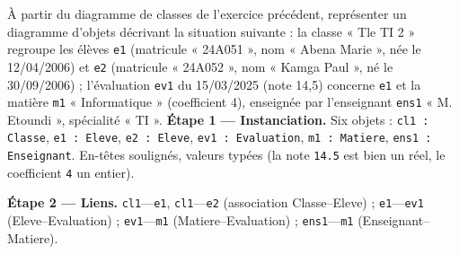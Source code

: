 \documentclass[11pt]{article}
\begin{document}
\begin{exoresolu}
À partir du diagramme de classes de l'exercice précédent, représenter un diagramme d'objets décrivant la situation suivante : la classe « Tle TI 2 » regroupe les élèves \texttt{e1} (matricule « 24A051 », nom « Abena Marie », née le 12/04/2006) et \texttt{e2} (matricule « 24A052 », nom « Kamga Paul », né le 30/09/2006) ; l'évaluation \texttt{ev1} du 15/03/2025 (note 14,5) concerne \texttt{e1} et la matière \texttt{m1} « Informatique » (coefficient 4), enseignée par l'enseignant \texttt{ens1} « M. Etoundi », spécialité « TI ».
\tcblower
\textbf{Étape 1 — Instanciation.} Six objets : \texttt{cl1 : Classe}, \texttt{e1 : Eleve}, \texttt{e2 : Eleve}, \texttt{ev1 : Evaluation}, \texttt{m1 : Matiere}, \texttt{ens1 : Enseignant}. En-têtes soulignés, valeurs typées (la note \texttt{14.5} est bien un réel, le coefficient \texttt{4} un entier).

\textbf{Étape 2 — Liens.} \texttt{cl1}—\texttt{e1}, \texttt{cl1}—\texttt{e2} (association Classe–Eleve) ; \texttt{e1}—\texttt{ev1} (Eleve–Evaluation) ; \texttt{ev1}—\texttt{m1} (Matiere–Evaluation) ; \texttt{ens1}—\texttt{m1} (Enseignant–Matiere).


\end{exoresolu}
\end{document}
